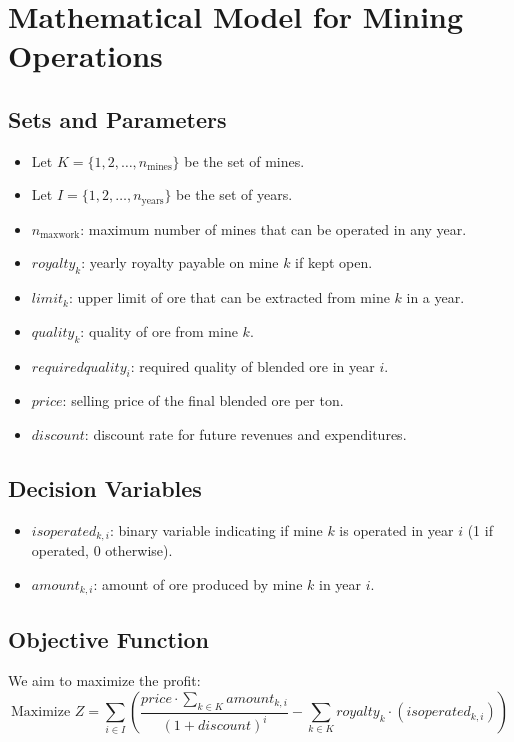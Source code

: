 \documentclass{article}
\begin{document}
\section*{Mathematical Model for Mining Operations}

\subsection*{Sets and Parameters}
\begin{itemize}
    \item Let \( K = \{1, 2, \ldots, n_{\text{mines}}\} \) be the set of mines.
    \item Let \( I = \{1, 2, \ldots, n_{\text{years}}\} \) be the set of years.
    \item \( n_{\text{maxwork}} \): maximum number of mines that can be operated in any year.
    \item \( royalty_k \): yearly royalty payable on mine \( k \) if kept open.
    \item \( limit_k \): upper limit of ore that can be extracted from mine \( k \) in a year.
    \item \( quality_k \): quality of ore from mine \( k \).
    \item \( requiredquality_i \): required quality of blended ore in year \( i \).
    \item \( price \): selling price of the final blended ore per ton.
    \item \( discount \): discount rate for future revenues and expenditures.
\end{itemize}

\subsection*{Decision Variables}
\begin{itemize}
    \item \( isoperated_{k,i} \): binary variable indicating if mine \( k \) is operated in year \( i \) (1 if operated, 0 otherwise).
    \item \( amount_{k,i} \): amount of ore produced by mine \( k \) in year \( i \).
\end{itemize}

\subsection*{Objective Function}
We aim to maximize the profit:
\[
\text{Maximize } Z = \sum_{i \in I} \left( \frac{price \cdot \sum_{k \in K} amount_{k,i}}{(1 + discount)^i} - \sum_{k \in K} royalty_k \cdot (isoperated_{k,i}) \right)
\]
\end{document}
